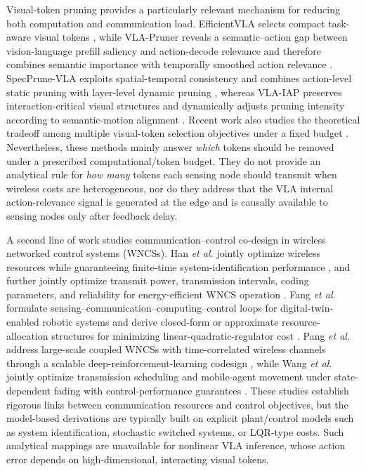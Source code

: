 \documentclass[lettersize,journal]{IEEEtran}
\theoremstyle{custom}
\begin{document}
Visual-token pruning provides a particularly relevant mechanism for reducing both computation and communication load. EfficientVLA selects compact task-aware visual tokens \cite{yang2025efficientvla}, while VLA-Pruner reveals a semantic--action gap between vision-language prefill saliency and action-decode relevance and therefore combines semantic importance with temporally smoothed action relevance \cite{liu2026vlapruner}. SpecPrune-VLA exploits spatial-temporal consistency and combines action-level static pruning with layer-level dynamic pruning \cite{wang2026specprune}, whereas VLA-IAP preserves interaction-critical visual structures and dynamically adjusts pruning intensity according to semantic-motion alignment \cite{cheng2026vlaiap}. Recent work also studies the theoretical tradeoff among multiple visual-token selection objectives under a fixed budget \cite{li2026balancedcovering}. Nevertheless, these methods mainly answer \emph{which} tokens should be removed under a prescribed computational/token budget. They do not provide an analytical rule for \emph{how many} tokens each sensing node should transmit when wireless costs are heterogeneous, nor do they address that the VLA internal action-relevance signal is generated at the edge and is causally available to sensing nodes only after feedback delay.
\IEEEpubidadjcol

A second line of work studies communication--control co-design in wireless networked control systems (WNCSs). Han \emph{et al.} jointly optimize wireless resources while guaranteeing finite-time system-identification performance \cite{han2024wsi}, and further jointly optimize transmit power, transmission intervals, coding parameters, and reliability for energy-efficient WNCS operation \cite{han2026energy}. Fang \emph{et al.} formulate sensing--communication--computing--control loops for digital-twin-enabled robotic systems and derive closed-form or approximate resource-allocation structures for minimizing linear-quadratic-regulator cost \cite{fang2025sc3}. Pang \emph{et al.} address large-scale coupled WNCSs with time-correlated wireless channels through a scalable deep-reinforcement-learning codesign \cite{pang2025codesign}, while Wang \emph{et al.} jointly optimize transmission scheduling and mobile-agent movement under state-dependent fading with control-performance guarantees \cite{wang2025heterogeneous}. These studies establish rigorous links between communication resources and control objectives, but the model-based derivations are typically built on explicit plant/control models such as system identification, stochastic switched systems, or LQR-type costs. Such analytical mappings are unavailable for nonlinear VLA inference, whose action error depends on high-dimensional, interacting visual tokens.
\end{document}
